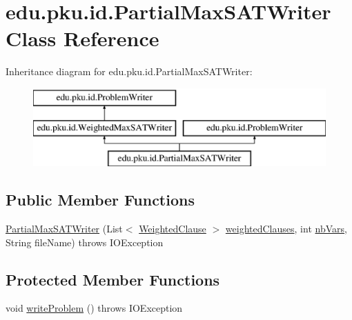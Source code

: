 \hypertarget{classedu_1_1pku_1_1id_1_1_partial_max_s_a_t_writer}{
\section{edu.pku.id.PartialMaxSATWriter Class Reference}
\label{classedu_1_1pku_1_1id_1_1_partial_max_s_a_t_writer}
}
Inheritance diagram for edu.pku.id.PartialMaxSATWriter:\begin{figure}[H]
\begin{center}
\leavevmode
\includegraphics[height=3.000000cm]{classedu_1_1pku_1_1id_1_1_partial_max_s_a_t_writer}
\end{center}
\end{figure}
\subsection*{Public Member Functions}
\begin{DoxyCompactItemize}
\item 
\hyperlink{classedu_1_1pku_1_1id_1_1_partial_max_s_a_t_writer_a59072d3e1439a0bf31b35aedb1cfffc3}{PartialMaxSATWriter} (List$<$ \hyperlink{classedu_1_1pku_1_1id_1_1_weighted_clause}{WeightedClause} $>$ \hyperlink{classedu_1_1pku_1_1id_1_1_weighted_max_s_a_t_writer_a73dc99c36bfbaf938f3ffb7b95189d37}{weightedClauses}, int \hyperlink{classedu_1_1pku_1_1id_1_1_weighted_max_s_a_t_writer_ae9c3e5d651a1b8100fd5d85f00a18a54}{nbVars}, String fileName)  throws IOException 
\end{DoxyCompactItemize}
\subsection*{Protected Member Functions}
\begin{DoxyCompactItemize}
\item 
void \hyperlink{classedu_1_1pku_1_1id_1_1_partial_max_s_a_t_writer_ab066f4e7f38654fefdeb3cc02b56026f}{writeProblem} ()  throws IOException 
\end{DoxyCompactItemize}


